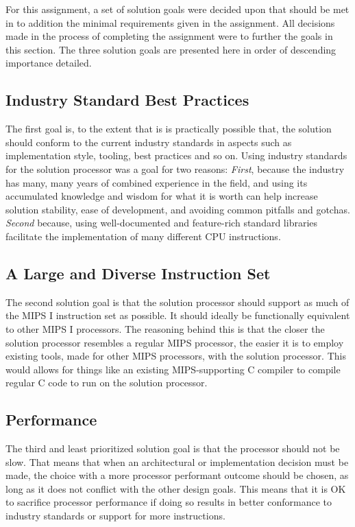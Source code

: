For this assignment, a set of solution goals were decided upon that should be met in to addition the minimal requirements given in the assignment.
All decisions made in the process of completing the assignment were to further the goals in this section.
The three solution goals are presented here in order of descending importance detailed.

\subsection{Industry Standard Best Practices} \label{sec:goals-industry-standards}

The first goal is, to the extent that is is practically possible that, the solution should conform to the current industry standards in aspects such as implementation style, tooling, best practices and so on.
Using industry standards for the solution processor was a goal for two reasons:
\textit{First}, because the industry has many, many years of combined experience in the field, and using its accumulated knowledge and wisdom for what it is worth can help increase solution stability, ease of development, and avoiding common pitfalls and gotchas.
\textit{Second} because, using well-documented and feature-rich standard libraries facilitate the implementation of many different CPU instructions.

\subsection{A Large and Diverse Instruction Set} \label{sec:goals-instruction-set}

The second solution goal is that the solution processor should support as much of the MIPS I instruction set as possible.
It should ideally be functionally equivalent to other MIPS I processors.
The reasoning behind this is that the closer the solution processor resembles a regular MIPS processor, the easier it is to employ existing tools, made for other MIPS processors, with the solution processor.
This would allows for things like an existing MIPS-supporting C compiler to compile regular C code to run on the solution processor.

\subsection{Performance} \label{sec:goals-performance}

The third and least prioritized solution goal is that the processor should not be slow.
That means that when an architectural or implementation decision must be made, the choice with a more processor performant outcome should be chosen, as long as it does not conflict with the other design goals.
This means that it is OK to sacrifice processor performance if doing so results in better conformance to industry standards or support for more instructions.

